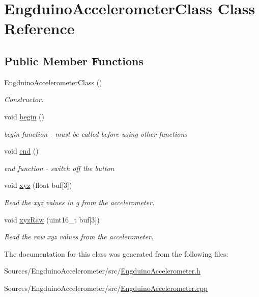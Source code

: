 \hypertarget{class_engduino_accelerometer_class}{}\section{Engduino\+Accelerometer\+Class Class Reference}
\label{class_engduino_accelerometer_class}
\subsection*{Public Member Functions}
\begin{DoxyCompactItemize}
\item 
\hyperlink{group___engduino_accelerometer_gabd01eb4c2e42c23a45d098c424818a54}{Engduino\+Accelerometer\+Class} ()
\begin{DoxyCompactList}\small\item\em Constructor. \end{DoxyCompactList}\item 
void \hyperlink{group___engduino_accelerometer_ga1267f368f111656af2dfcfd252096983}{begin} ()
\begin{DoxyCompactList}\small\item\em begin function -\/ must be called before using other functions \end{DoxyCompactList}\item 
void \hyperlink{group___engduino_accelerometer_gaa63eadbabe2812225ceb7a4427eae2e1}{end} ()
\begin{DoxyCompactList}\small\item\em end function -\/ switch off the button \end{DoxyCompactList}\item 
void \hyperlink{group___engduino_accelerometer_ga2f8b224cebb17ba5f17b3cac836498d1}{xyz} (float buf\mbox{[}3\mbox{]})
\begin{DoxyCompactList}\small\item\em Read the xyz values in g from the accelerometer. \end{DoxyCompactList}\item 
void \hyperlink{group___engduino_accelerometer_gaf0aa7528ab8899701428fac56ea7013a}{xyz\+Raw} (uint16\+\_\+t buf\mbox{[}3\mbox{]})
\begin{DoxyCompactList}\small\item\em Read the raw xyz values from the accelerometer. \end{DoxyCompactList}\end{DoxyCompactItemize}


The documentation for this class was generated from the following files\+:\begin{DoxyCompactItemize}
\item 
Sources/\+Engduino\+Accelerometer/src/\hyperlink{_engduino_accelerometer_8h}{Engduino\+Accelerometer.\+h}\item 
Sources/\+Engduino\+Accelerometer/src/\hyperlink{_engduino_accelerometer_8cpp}{Engduino\+Accelerometer.\+cpp}\end{DoxyCompactItemize}
